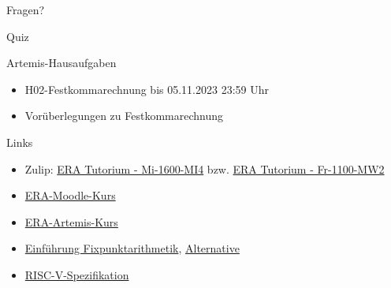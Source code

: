 \documentclass[
  german,            %
  aspectratio=169,    %
]{tumbeamer}
\begin{document}
\begin{frame}[c]{}{}
  \begin{center}
    \LARGE Fragen?
  \end{center}
\end{frame}

\begin{frame}[c]{}{}
  \begin{center}
    \LARGE Quiz
  \end{center}
\end{frame}

\begin{frame}[c]{Artemis-Hausaufgaben}{}
  \begin{itemize}
    \item H02-Festkommarechnung bis 05.11.2023 23:59 Uhr
    \item Vorüberlegungen zu Festkommarechnung
  \end{itemize}
\end{frame}

\begin{frame}[fragile, c]{Links}{}
  \begin{itemize}
    \item Zulip: \href{https://zulip.in.tum.de/#narrow/stream/1917-ERA-Tutorium---Mi-1600-MI4}{\glqq ERA Tutorium - Mi-1600-MI4\grqq}
    bzw. \href{https://zulip.in.tum.de/#narrow/stream/1940-ERA-Tutorium---Fr-1100-MW2}{\glqq ERA Tutorium - Fr-1100-MW2\grqq}
    \item \href{https://www.moodle.tum.de/course/view.php?id=90679}{ERA-Moodle-Kurs}
    \item \href{https://artemis.in.tum.de/courses/288/exercises}{ERA-Artemis-Kurs}
    \item \href{https://vanhunteradams.com/FixedPoint/FixedPoint.html}{Einführung Fixpunktarithmetik}, \href{https://specbranch.com/posts/fixed-point/}{Alternative}
    \item \href{https://riscv.org/wp-content/uploads/2017/05/riscv-spec-v2.2.pdf}{RISC-V-Spezifikation}
  \end{itemize}
\end{frame}

\maketitle
\end{document}
